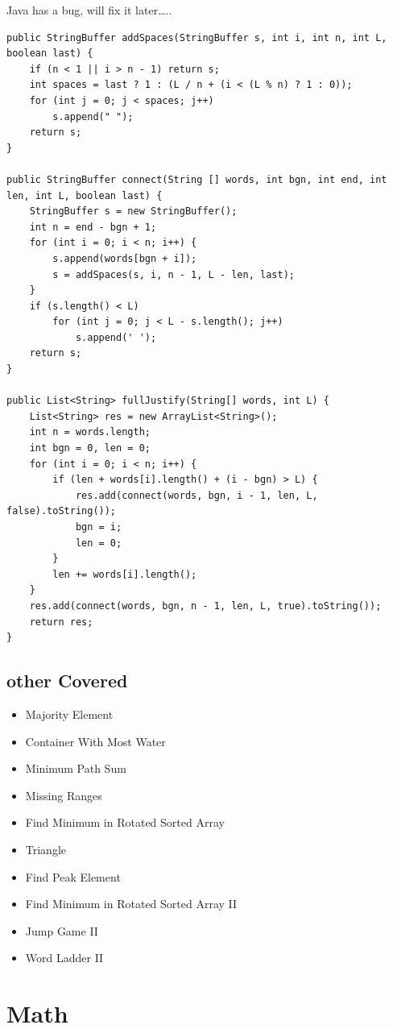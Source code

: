 \documentclass[12pt]{book}
\begin{document}
Java has a bug, will fix it later\ldots{}..

\lstset{language=java,label= ,caption= ,numbers=none}
\begin{lstlisting}
public StringBuffer addSpaces(StringBuffer s, int i, int n, int L, boolean last) {
    if (n < 1 || i > n - 1) return s;
    int spaces = last ? 1 : (L / n + (i < (L % n) ? 1 : 0));
    for (int j = 0; j < spaces; j++)
        s.append(" ");
    return s;
}
        
public StringBuffer connect(String [] words, int bgn, int end, int len, int L, boolean last) {
    StringBuffer s = new StringBuffer();
    int n = end - bgn + 1;
    for (int i = 0; i < n; i++) {
        s.append(words[bgn + i]);
        s = addSpaces(s, i, n - 1, L - len, last);
    }
    if (s.length() < L)
        for (int j = 0; j < L - s.length(); j++) 
            s.append(' ');
    return s;
}
        
public List<String> fullJustify(String[] words, int L) {
    List<String> res = new ArrayList<String>();
    int n = words.length;
    int bgn = 0, len = 0;
    for (int i = 0; i < n; i++) {
        if (len + words[i].length() + (i - bgn) > L) {
            res.add(connect(words, bgn, i - 1, len, L, false).toString());
            bgn = i;
            len = 0;
        }
        len += words[i].length();
    }
    res.add(connect(words, bgn, n - 1, len, L, true).toString());
    return res;
}
\end{lstlisting}

\section{other Covered}
\label{sec-20-2}
\begin{itemize}
\item Majority Element
\item Container With Most Water
\item Minimum Path Sum
\item Missing Ranges
\item Find Minimum in Rotated Sorted Array
\item Triangle
\item Find Peak Element
\item Find Minimum in Rotated Sorted Array II
\item Jump Game II
\item Word Ladder II
\end{itemize}

\chapter{Math}
\label{sec-21}
\end{document}
